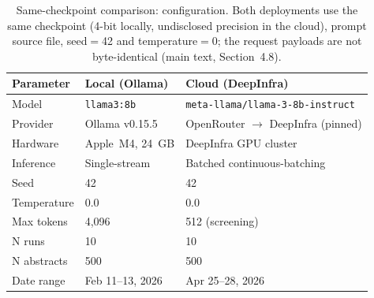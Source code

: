\documentclass[11pt]{article}
\newenvironment{fittab}{\begin{lrbox}{\fittabbox}}{\end{lrbox}%
  \ifdim\wd\fittabbox>\linewidth\resizebox{\linewidth}{!}{\usebox{\fittabbox}}\else\usebox{\fittabbox}\fi}
\begin{document}
\begin{table}[htbp]
\centering
\caption{Same-checkpoint comparison: configuration. Both deployments use the same checkpoint (4-bit locally, undisclosed precision in the cloud), prompt source file, seed${=}$42 and temperature${=}$0; the request payloads are not byte-identical (main text, Section~4.8).}
\label{tab:desconfound_supp}
\begin{fittab}\begin{tabular}{lll}
\toprule
\textbf{Parameter} & \textbf{Local (Ollama)} & \textbf{Cloud (DeepInfra)} \\
\midrule
Model               & \texttt{llama3:8b} & \texttt{meta-llama/llama-3-8b-instruct} \\
Provider            & Ollama v0.15.5     & OpenRouter $\to$ DeepInfra (pinned) \\
Hardware            & Apple~M4, 24~GB    & DeepInfra GPU cluster \\
Inference           & Single-stream      & Batched continuous-batching \\
Seed                & 42                 & 42 \\
Temperature         & 0.0                & 0.0 \\
Max tokens          & 4{,}096            & 512 (screening) \\
N runs              & 10                 & 10 \\
N abstracts         & 500                & 500 \\
Date range          & Feb 11--13, 2026   & Apr 25--28, 2026 \\
\bottomrule
\end{tabular}\end{fittab}
\end{table}
\end{document}
